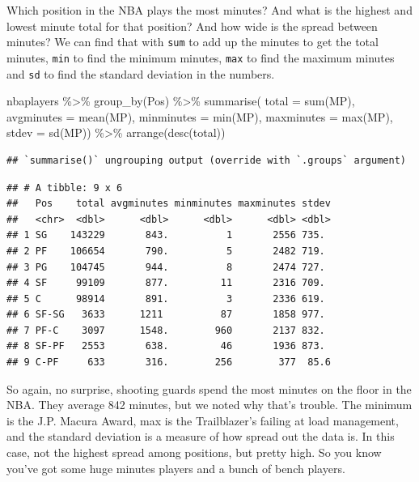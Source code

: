 \documentclass[
]{book}
\newenvironment{Shaded}{\begin{snugshade}}{\end{snugshade}}
\newcommand{\AttributeTok}[1]{\textcolor[rgb]{0.77,0.63,0.00}{#1}}
\newcommand{\FunctionTok}[1]{\textcolor[rgb]{0.00,0.00,0.00}{#1}}
\newcommand{\NormalTok}[1]{#1}
\newcommand{\SpecialCharTok}[1]{\textcolor[rgb]{0.00,0.00,0.00}{#1}}
\begin{document}
Which position in the NBA plays the most minutes? And what is the highest and lowest minute total for that position? And how wide is the spread between minutes? We can find that with \texttt{sum} to add up the minutes to get the total minutes, \texttt{min} to find the minimum minutes, \texttt{max} to find the maximum minutes and \texttt{sd} to find the standard deviation in the numbers.

\begin{Shaded}
\begin{Highlighting}[]
\NormalTok{nbaplayers }\SpecialCharTok{\%\textgreater{}\%} 
  \FunctionTok{group\_by}\NormalTok{(Pos) }\SpecialCharTok{\%\textgreater{}\%} 
  \FunctionTok{summarise}\NormalTok{(}
    \AttributeTok{total =} \FunctionTok{sum}\NormalTok{(MP), }
    \AttributeTok{avgminutes =} \FunctionTok{mean}\NormalTok{(MP), }
    \AttributeTok{minminutes =} \FunctionTok{min}\NormalTok{(MP),}
    \AttributeTok{maxminutes =} \FunctionTok{max}\NormalTok{(MP),}
    \AttributeTok{stdev =} \FunctionTok{sd}\NormalTok{(MP)) }\SpecialCharTok{\%\textgreater{}\%} \FunctionTok{arrange}\NormalTok{(}\FunctionTok{desc}\NormalTok{(total))}
\end{Highlighting}
\end{Shaded}

\begin{verbatim}
## `summarise()` ungrouping output (override with `.groups` argument)
\end{verbatim}

\begin{verbatim}
## # A tibble: 9 x 6
##   Pos    total avgminutes minminutes maxminutes stdev
##   <chr>  <dbl>      <dbl>      <dbl>      <dbl> <dbl>
## 1 SG    143229       843.          1       2556 735. 
## 2 PF    106654       790.          5       2482 719. 
## 3 PG    104745       944.          8       2474 727. 
## 4 SF     99109       877.         11       2316 709. 
## 5 C      98914       891.          3       2336 619. 
## 6 SF-SG   3633      1211          87       1858 977. 
## 7 PF-C    3097      1548.        960       2137 832. 
## 8 SF-PF   2553       638.         46       1936 873. 
## 9 C-PF     633       316.        256        377  85.6
\end{verbatim}

So again, no surprise, shooting guards spend the most minutes on the floor in the NBA. They average 842 minutes, but we noted why that's trouble. The minimum is the J.P. Macura Award, max is the Trailblazer's failing at load management, and the standard deviation is a measure of how spread out the data is. In this case, not the highest spread among positions, but pretty high. So you know you've got some huge minutes players and a bunch of bench players.
\end{document}
